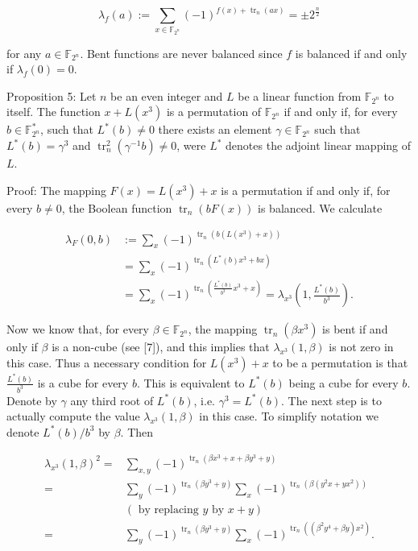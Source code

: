 \documentclass[10pt]{article}
\begin{document}
$$
\lambda_{f}(a):=\sum_{x \in \mathbb{F}_{2^{n}}}(-1)^{f(x)+\operatorname{tr}_{n}(a x)}= \pm 2^{\frac{n}{2}}
$$

for any $a \in \mathbb{F}_{2^{n}}$. Bent functions are never balanced since $f$ is balanced if and only if $\lambda_{f}(0)=0$.

Proposition 5: Let $n$ be an even integer and $L$ be a linear function from $\mathbb{F}_{2^{n}}$ to itself. The function $x+L\left(x^{3}\right)$ is a permutation of $\mathbb{F}_{2^{n}}$ if and only if, for every $b \in \mathbb{F}_{2^{n}}^{*}$, such that $L^{*}(b) \neq 0$ there exists an element $\gamma \in \mathbb{F}_{2^{n}}$ such that $L^{*}(b)=\gamma^{3}$ and $\operatorname{tr}_{n}^{2}\left(\gamma^{-1} b\right) \neq 0$, were $L^{*}$ denotes the adjoint linear mapping of $L$.

Proof: The mapping $F(x)=L\left(x^{3}\right)+x$ is a permutation if and only if, for every $b \neq 0$, the Boolean function $\operatorname{tr}_{n}(b F(x))$ is balanced. We calculate

$$
\begin{aligned}
\lambda_{F}(0, b) & :=\sum_{x}(-1)^{\operatorname{tr}_{n}\left(b\left(L\left(x^{3}\right)+x\right)\right)} \\
& =\sum_{x}(-1)^{\operatorname{tr}_{n}\left(L^{*}(b) x^{3}+b x\right)} \\
& =\sum_{x}(-1)^{\operatorname{tr}_{n}\left(\frac{L^{*}(b)}{b^{3}} x^{3}+x\right)}=\lambda_{x^{3}}\left(1, \frac{L^{*}(b)}{b^{3}}\right) .
\end{aligned}
$$

Now we know that, for every $\beta \in \mathbb{F}_{2^{n}}$, the mapping $\operatorname{tr}_{n}\left(\beta x^{3}\right)$ is bent if and only if $\beta$ is a non-cube (see [7]), and this implies that $\lambda_{x^{3}}(1, \beta)$ is not zero in this case. Thus a necessary condition for $L\left(x^{3}\right)+x$ to be a permutation is that $\frac{L^{*}(b)}{b^{3}}$ is a cube for every $b$. This is equivalent to $L^{*}(b)$ being a cube for every $b$. Denote by $\gamma$ any third root of $L^{*}(b)$, i.e. $\gamma^{3}=L^{*}(b)$. The next step is to actually compute the value $\lambda_{x^{3}}(1, \beta)$ in this case. To simplify notation we denote $L^{*}(b) / b^{3}$ by $\beta$. Then

$$
\begin{aligned}
\lambda_{x^{3}}(1, \beta)^{2}= & \sum_{x, y}(-1)^{\operatorname{tr}_{n}\left(\beta x^{3}+x+\beta y^{3}+y\right)} \\
= & \sum_{y}(-1)^{\operatorname{tr}_{n}\left(\beta y^{3}+y\right)} \sum_{x}(-1)^{\operatorname{tr}_{n}\left(\beta\left(y^{2} x+y x^{2}\right)\right)} \\
& (\text { by replacing } y \text { by } x+y) \\
= & \sum_{y}(-1)^{\operatorname{tr}_{n}\left(\beta y^{3}+y\right)} \sum_{x}(-1)^{\operatorname{tr}_{n}\left(\left(\beta^{2} y^{4}+\beta y\right) x^{2}\right)} .
\end{aligned}
$$
\end{document}
